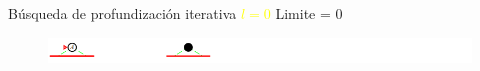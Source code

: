     \begin{frame}{Búsqueda de profundización iterativa \textcolor{Yellow}{$l=0$}}
        Limite = 0
        \begin{figure}\includegraphics[width =123mm]{62_IDS_l0.PNG}\end{figure}
    \end{frame}